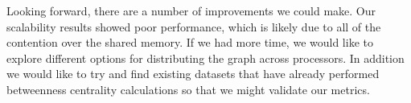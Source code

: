 \documentclass[11pt,a4paper,titlepage]{article}
\begin{document}
Looking forward, there are a number of improvements we could make. Our
scalability results showed poor performance, which is likely due to all of the
contention over the shared memory. If we had more time, we would like to
explore different options for distributing the graph across processors. In
addition we would like to try and find existing datasets that have already
performed betweenness centrality calculations so that we might validate our
metrics.



\newpage


\end{document}
